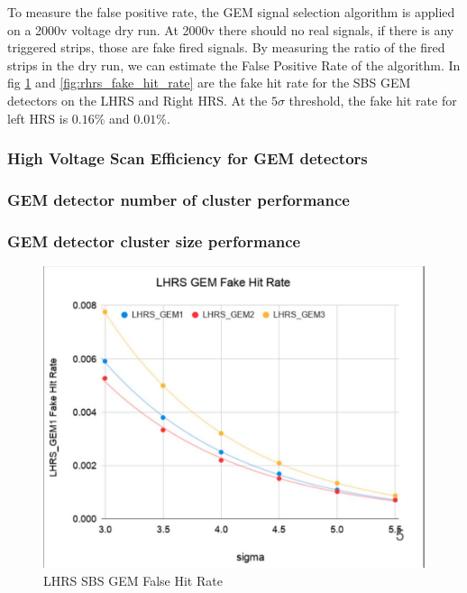 To measure the false positive rate, the GEM signal selection algorithm is applied on a 2000v voltage dry run. At 2000v there should no real signals, if there is any triggered strips, those are fake fired signals. By measuring the ratio of the fired strips in the dry run, we can estimate the False Positive Rate of the algorithm. In fig \ref{fig:lhrs_fake_hit_rate} and \ref{fig:rhrs_fake_hit_rate} are the fake hit rate for the SBS GEM detectors on the LHRS and Right HRS. At the $5\sigma$ threshold, the fake hit rate for left HRS is $0.16\%$ and $0.01\%$.

\subsubsection{High Voltage Scan Efficiency for GEM detectors}
\subsubsection{GEM detector number of cluster performance}
\subsubsection{GEM detector cluster size performance}


\begin{figure}[!htbp]
    \centering
    \includegraphics[width=\textwidth]{images/chap5/lhrs_fake_hit_rate.png}
    \caption{LHRS SBS GEM False Hit Rate}
    \label{fig:lhrs_fake_hit_rate}
\end{figure}

